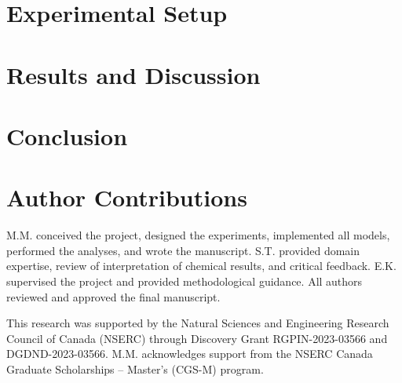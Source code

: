 \documentclass[journal=jcisd8,manuscript=article]{achemso}
\begin{document}
\section{Experimental Setup}
\label{sec:experiments}


\section{Results and Discussion}


\section{Conclusion}


\section{Author Contributions}

M.M. conceived the project, designed the experiments, implemented all models, performed the analyses, and wrote the manuscript. 
S.T. provided domain expertise, review of interpretation of chemical results, and critical feedback. 
E.K. supervised the project and provided methodological guidance. 
All authors reviewed and approved the final manuscript.

\begin{acknowledgement}
This research was supported by the Natural Sciences and Engineering Research Council of Canada (NSERC) through Discovery Grant RGPIN-2023-03566 and DGDND-2023-03566. M.M. acknowledges support from the NSERC Canada Graduate Scholarships – Master’s (CGS-M) program.
\end{acknowledgement}



\begin{suppinfo}



\end{suppinfo}
\end{document}
